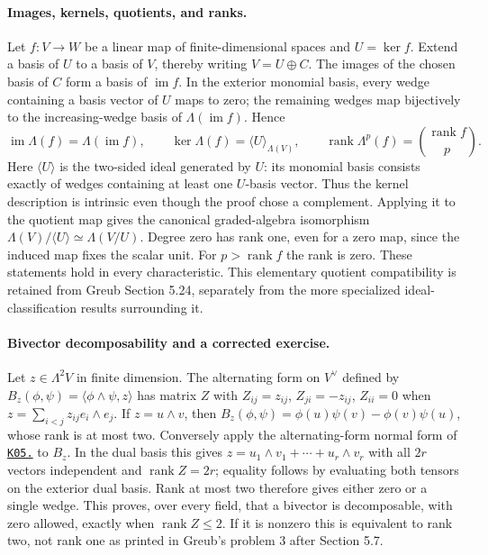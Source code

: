 \documentclass[11pt,a4paper]{book}
\theoremstyle{definition}\newtheorem{definition}[theorem]{Definition}
\theoremstyle{remark}\newtheorem{remark}[theorem]{Remark}
\DeclareMathOperator{\im}{im}\DeclareMathOperator{\rank}{rank}
\newcommand{\kref}[1]{\hyperref[k:#1]{\texttt{K05.\detokenize{#1}}}}
\begin{document}
\paragraph{Images, kernels, quotients, and ranks.}
Let $f:V\to W$ be a linear map of finite-dimensional spaces and $U=\ker f$. Extend a basis of $U$ to a basis of $V$, thereby writing $V=U\oplus C$. The images of the chosen basis of $C$ form a basis of $\im f$. In the exterior monomial basis, every wedge containing a basis vector of $U$ maps to zero; the remaining wedges map bijectively to the increasing-wedge basis of $\Lambda(\im f)$. Hence
\[
 \im\Lambda(f)=\Lambda(\im f),\qquad
 \ker\Lambda(f)=\langle U\rangle_{\Lambda(V)},\qquad
 \rank\Lambda^p(f)=\binom{\rank f}{p}.
\]
Here $\langle U\rangle$ is the two-sided ideal generated by $U$: its monomial basis consists exactly of wedges containing at least one $U$-basis vector. Thus the kernel description is intrinsic even though the proof chose a complement. Applying it to the quotient map gives the canonical graded-algebra isomorphism
$\Lambda(V)/\langle U\rangle\simeq\Lambda(V/U)$.
Degree zero has rank one, even for a zero map, since the induced map fixes the scalar unit. For $p>\rank f$ the rank is zero. These statements hold in every characteristic. This elementary quotient compatibility is retained from Greub Section 5.24, separately from the more specialized ideal-classification results surrounding it.

\paragraph{Bivector decomposability and a corrected exercise.}
Let $z\in\Lambda^2V$ in finite dimension. The alternating form on $V^\vee$ defined by
$B_z(\phi,\psi)=\langle\phi\wedge\psi,z\rangle$
has matrix $Z$ with $Z_{ij}=z_{ij}$, $Z_{ji}=-z_{ij}$, $Z_{ii}=0$ when $z=\sum_{i<j}z_{ij}e_i\wedge e_j$. If $z=u\wedge v$, then
$B_z(\phi,\psi)=\phi(u)\psi(v)-\phi(v)\psi(u)$, whose rank is at most two. Conversely apply the alternating-form normal form of \kref{11.symplectic_blocks} to $B_z$. In the dual basis this gives $z=u_1\wedge v_1+\cdots+u_r\wedge v_r$ with all $2r$ vectors independent and $\rank Z=2r$; equality follows by evaluating both tensors on the exterior dual basis. Rank at most two therefore gives either zero or a single wedge. This proves, over every field, that a bivector is decomposable, with zero allowed, exactly when $\rank Z\le2$. If it is nonzero this is equivalent to rank two, not rank one as printed in Greub's problem 3 after Section 5.7.
\end{document}
